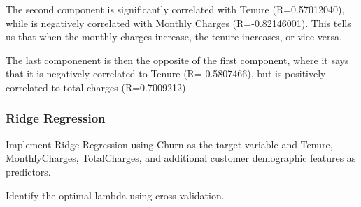 \documentclass[
]{article}
\begin{document}
The second component is significantly correlated with Tenure
(R=0.57012040), while is negatively correlated with Monthly Charges
(R=-0.82146001). This tells us that when the monthly charges increase,
the tenure increases, or vice versa.

The last componenent is then the opposite of the first component, where
it says that it is negatively correlated to Tenure (R=-0.5807466), but
is positively correlated to total charges (R=0.7009212)

\subsubsection{Ridge Regression}\label{ridge-regression}

Implement Ridge Regression using Churn as the target variable and
Tenure, MonthlyCharges, TotalCharges, and additional customer
demographic features as predictors.

Identify the optimal lambda using cross-validation.
\end{document}
